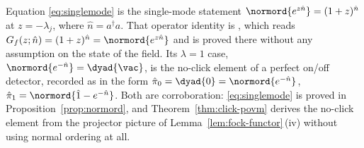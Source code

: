 
\begin{remark}\label{rem:konig}
Equation \eqref{eq:singlemode} is the single-mode statement
$\normord{e^{z\hat n}}=(1+z)^{\hat n}$ at $z=-\lambda_j$, where
$\hat n=a^\dagger a$. That operator identity is
\cite[Eq.~(3.23)]{konig2021newton}, which reads
$G_f(z;\hat n)=(1+z)^{\hat n}=\normord{e^{z\hat n}}$ and is proved there
without any assumption on the state of the field. Its $\lambda=1$ case,
$\normord{e^{-\hat n}}=\dyad{\vac}$, is the no-click element of a perfect
on/off detector, recorded as \cite[Eq.~(6)]{sperling2012} in the form
$\hat\pi_0=\dyad{0}=\normord{e^{-\hat n}}$, $\hat\pi_1=\normord{\hat 1-e^{-\hat
n}}$. Both are corroboration: \eqref{eq:singlemode} is proved in
Proposition~\ref{prop:normord}, and Theorem~\ref{thm:click-povm} derives the
no-click element from the projector picture of
Lemma~\ref{lem:fock-functor}\,(iv) without using normal ordering at all.
\end{remark}
